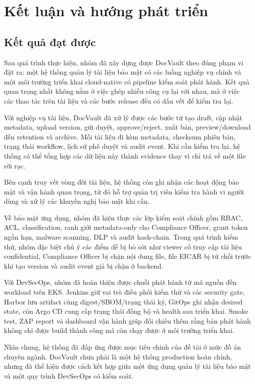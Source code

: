 \chapter{Kết luận và hướng phát triển}

\section{Kết quả đạt được}

Sau quá trình thực hiện, nhóm đã xây dựng được DocVault theo đúng phạm vi đặt ra: một hệ thống quản lý tài liệu bảo mật có các luồng nghiệp vụ chính và một môi trường triển khai cloud-native có pipeline kiểm soát phát hành. Kết quả quan trọng nhất không nằm ở việc ghép nhiều công cụ lại với nhau, mà ở việc các thao tác trên tài liệu và các bước release đều có dấu vết để kiểm tra lại.

Với nghiệp vụ tài liệu, DocVault đã xử lý được các bước từ tạo draft, cập nhật metadata, upload version, gửi duyệt, approve/reject, xuất bản, preview/download đến retention và archive. Mỗi tài liệu đi kèm metadata, checksum phiên bản, trạng thái workflow, lịch sử phê duyệt và audit event. Khi cần kiểm tra lại, hệ thống có thể tổng hợp các dữ liệu này thành evidence thay vì chỉ trả về một file rời rạc.

Bên cạnh truy vết vòng đời tài liệu, hệ thống còn ghi nhận các hoạt động bảo mật và vận hành quan trọng, từ đó hỗ trợ quản trị viên kiểm tra hành vi người dùng và xử lý các khuyến nghị bảo mật khi cần.

Về bảo mật ứng dụng, nhóm đã hiện thực các lớp kiểm soát chính gồm RBAC, ACL, classification, ranh giới metadata-only cho Compliance Officer, grant token ngắn hạn, malware scanning, DLP và audit hash-chain. Trong quá trình kiểm thử, nhóm đặc biệt chú ý các điểm dễ bị bỏ sót như viewer cố truy cập tài liệu confidential, Compliance Officer bị chặn nội dung file, file EICAR bị từ chối trước khi tạo version và audit event giả bị chặn ở backend.

Với DevSecOps, nhóm đã hoàn thiện được chuỗi phát hành từ mã nguồn đến workload trên EKS. Jenkins giữ vai trò điều phối kiểm thử và các security gate, Harbor lưu artifact cùng digest/SBOM/trạng thái ký, GitOps ghi nhận desired state, còn Argo CD cung cấp trạng thái đồng bộ và health sau triển khai. Smoke test, ZAP report và dashboard vận hành giúp đối chiếu thêm rằng bản phát hành không chỉ được build thành công mà còn chạy được ở môi trường triển khai.

Nhìn chung, hệ thống đã đáp ứng được mục tiêu chính của đề tài ở mức đồ án chuyên ngành. DocVault chưa phải là một hệ thống production hoàn chỉnh, nhưng đã thể hiện được cách kết hợp giữa một ứng dụng quản lý tài liệu bảo mật và một quy trình DevSecOps có kiểm soát.

